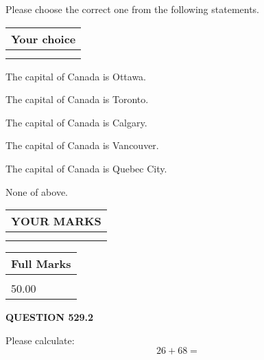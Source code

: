 \documentclass[12pt]{article}
\begin{document}
  
Please choose the correct one from the following statements.
  
  
\noindent\hspace{3.0in} \begin{tabular}{|l|}
\hline
Your choice \\
\hline
 \\ 
 \\ 
\hline
\end{tabular}
  
  
 
 
The capital of Canada is Ottawa.
 
 
The capital of Canada is Toronto.
 
 
The capital of Canada is Calgary.
 
 
The capital of Canada is Vancouver.
 
 
The capital of Canada is Quebec City.
 
 
 None of above.
 
 
  
\vspace{0.2in}
  
\noindent\begin{tabular}{|l|}
\hline
 YOUR MARKS  \\
\hline
 \\ 
 \\ 
\hline
\end{tabular}
\hspace{0.05in} \begin{tabular}{|l|}
\hline
 Full Marks  \\
\hline
 \\ 
50.00 \\
\hline
\end{tabular}
{\textbf{\Large{QUESTION
529.2 
}}}
  
  
 
Please calculate:
\begin{equation}
26 +  %
68 = \nonumber
\end{equation}
 

 

 
   
   
 \vspace{0.2in}
 
   
   
   
   
\end{document}
